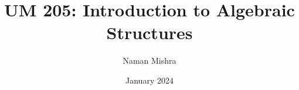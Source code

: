 \documentclass[12pt]{report}
\title{UM 205: Introduction to Algebraic Structures}
\author{Naman Mishra}
\date{January 2024}
\begin{document}
\maketitle
\tableofcontents
\listoflecture
    
    
    
    
    
    
    
    
    
    
    
    
    
    
    
    
    
    
    
    
    
    
    
    
    
    
    
    
    
    
    
    
    
    
    
\end{document}

